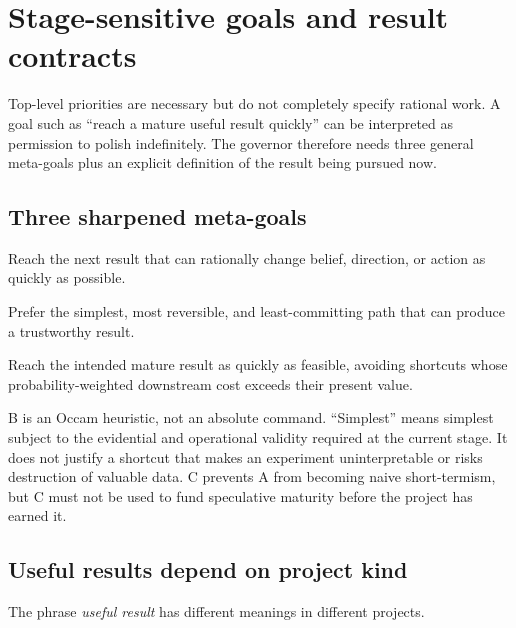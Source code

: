 \documentclass[11pt,letterpaper]{article}
\begin{document}
\section{Stage-sensitive goals and result contracts}

Top-level priorities are necessary but do not completely specify rational
work. A goal such as ``reach a mature useful result quickly'' can be
interpreted as permission to polish indefinitely. The governor therefore
needs three general meta-goals plus an explicit definition of the result being
pursued now.

\subsection{Three sharpened meta-goals}

\begin{description}[style=nextline]
  \item[A: Decision-relevant speed]
    Reach the next result that can rationally change belief, direction, or
    action as quickly as possible.
  \item[B: Least commitment]
    Prefer the simplest, most reversible, and least-committing path that can
    produce a trustworthy result.
  \item[C: Mature-result efficiency]
    Reach the intended mature result as quickly as feasible, avoiding shortcuts
    whose probability-weighted downstream cost exceeds their present value.
\end{description}

B is an Occam heuristic, not an absolute command. ``Simplest'' means simplest
subject to the evidential and operational validity required at the current
stage. It does not justify a shortcut that makes an experiment uninterpretable
or risks destruction of valuable data. C prevents A from becoming naive
short-termism, but C must not be used to fund speculative maturity before the
project has earned it.

\subsection{Useful results depend on project kind}

The phrase \emph{useful result} has different meanings in different projects.
\end{document}
